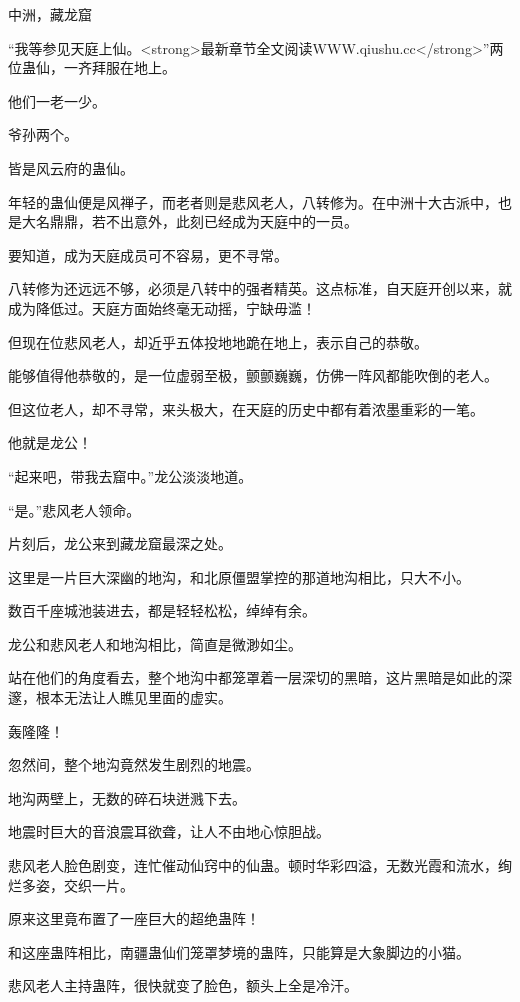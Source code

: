 
\begin{this_body}

中洲，藏龙窟

“我等参见天庭上仙。<strong>最新章节全文阅读WWW.qiushu.cc</strong>”两位蛊仙，一齐拜服在地上。

他们一老一少。

爷孙两个。

皆是风云府的蛊仙。

年轻的蛊仙便是风禅子，而老者则是悲风老人，八转修为。在中洲十大古派中，也是大名鼎鼎，若不出意外，此刻已经成为天庭中的一员。

要知道，成为天庭成员可不容易，更不寻常。

八转修为还远远不够，必须是八转中的强者精英。这点标准，自天庭开创以来，就成为降低过。天庭方面始终毫无动摇，宁缺毋滥！

但现在位悲风老人，却近乎五体投地地跪在地上，表示自己的恭敬。

能够值得他恭敬的，是一位虚弱至极，颤颤巍巍，仿佛一阵风都能吹倒的老人。

但这位老人，却不寻常，来头极大，在天庭的历史中都有着浓墨重彩的一笔。

他就是龙公！

“起来吧，带我去窟中。”龙公淡淡地道。

“是。”悲风老人领命。

片刻后，龙公来到藏龙窟最深之处。

这里是一片巨大深幽的地沟，和北原僵盟掌控的那道地沟相比，只大不小。

数百千座城池装进去，都是轻轻松松，绰绰有余。

龙公和悲风老人和地沟相比，简直是微渺如尘。

站在他们的角度看去，整个地沟中都笼罩着一层深切的黑暗，这片黑暗是如此的深邃，根本无法让人瞧见里面的虚实。

轰隆隆！

忽然间，整个地沟竟然发生剧烈的地震。

地沟两壁上，无数的碎石块迸溅下去。

地震时巨大的音浪震耳欲聋，让人不由地心惊胆战。

悲风老人脸色剧变，连忙催动仙窍中的仙蛊。顿时华彩四溢，无数光霞和流水，绚烂多姿，交织一片。

原来这里竟布置了一座巨大的超绝蛊阵！

和这座蛊阵相比，南疆蛊仙们笼罩梦境的蛊阵，只能算是大象脚边的小猫。

悲风老人主持蛊阵，很快就变了脸色，额头上全是冷汗。


\end{this_body}
